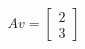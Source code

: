 \documentclass{article}
\begin{document}
\begin{align*}
Av=\begin{bmatrix}2\\3\end{bmatrix}
\end{align*}
\end{document}
